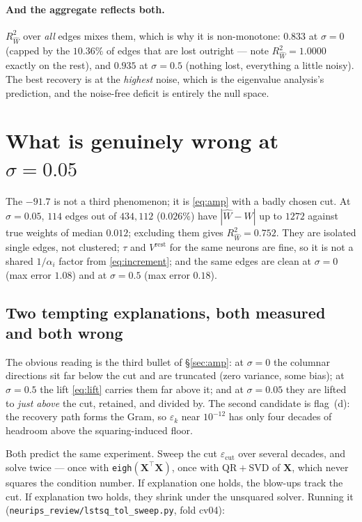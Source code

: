 \documentclass[11pt]{article}
\newcommand{\Mat}[1]{\mathbf{#1}}
\newcommand{\Rw}{R^2_{\widehat W}}
\newcommand{\eps}{\varepsilon}
\begin{document}
\paragraph{And the aggregate reflects both.} $\Rw$ over \emph{all} edges mixes
them, which is why it is non-monotone: $0.833$ at $\sigma=0$ (capped by the
$10.36\%$ of edges that are lost outright --- note $\Rw = 1.0000$ exactly on the
rest), and $0.935$ at $\sigma=0.5$ (nothing lost, everything a little noisy).
The best recovery is at the \emph{highest} noise, which is the eigenvalue
analysis's prediction, and the noise-free deficit is entirely the null space.

\section{What is genuinely wrong at $\sigma=0.05$}
\label{sec:cause}

The $-91.7$ is not a third phenomenon; it is \eqref{eq:amp} with a badly chosen
cut. At $\sigma = 0.05$, $114$ edges out of $434{,}112$ ($0.026\%$) have
$|\hat W - W|$ up to $1272$ against true weights of median $0.012$; excluding
them gives $\Rw = 0.752$. They are isolated single edges, not clustered; $\tau$
and $V^{\mathrm{rest}}$ for the same neurons are fine, so it is not a shared
$1/\alpha_i$ factor from \eqref{eq:increment}; and the same edges are clean at
$\sigma = 0$ (max error $1.08$) and at $\sigma = 0.5$ (max error $0.18$).

\subsection{Two tempting explanations, both measured and both wrong}

The obvious reading is the third bullet of §\ref{sec:amp}: at $\sigma=0$ the
columnar directions sit far below the cut and are truncated (zero variance, some
bias); at $\sigma=0.5$ the lift \eqref{eq:lift} carries them far above it; and at
$\sigma=0.05$ they are lifted to \emph{just above} the cut, retained, and divided
by. The second candidate is flag~(d): the recovery path forms the Gram, so
$\eps_k$ near $10^{-12}$ has only four decades of headroom above the
squaring-induced floor.

Both predict the same experiment. Sweep the cut $\eps_{\mathrm{cut}}$ over
several decades, and solve twice --- once with
\texttt{eigh}$(\Mat X^{\!\top}\Mat X)$, once with QR${}+{}$SVD of $\Mat X$, which
never squares the condition number. If explanation one holds, the blow-ups track
the cut. If explanation two holds, they shrink under the unsquared solver.
Running it (\texttt{neurips\_review/lstsq\_tol\_sweep.py}, fold cv04):
\end{document}
